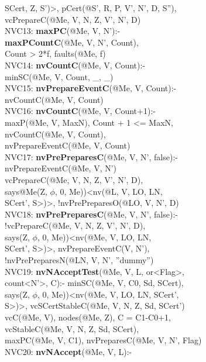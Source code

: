 \begin{code}
\> SCert, Z, S')>, pCert(@S', R, P, V', N', D, S''),\\
\> vcPrepareC(@Me, V, N, Z, V', N', D)\\
NVC13: \textbf{maxPC}(@Me, V, N'):- \\
\> \textbf{maxPCountC}(@Me, V, N', Count),\\
\> Count > 2*f, faults(@Me, f)\\
NVC14: \textbf{nvCountC}(@Me, V, Count):-\\
\> minSC(@Me, V, Count, \_, \_)\\
NVC15: \textbf{nvPrepareEventC}(@Me, V, Count):-\\
\> nvCountC(@Me, V, Count)\\
NVC16: \textbf{nvCountC}(@Me, V, Count+1):-\\
\> maxP(@Me, V, MaxN), Count + 1 <= MaxN, \\
\> nvCountC(@Me, V, Count), \\
\> nvPrepareEventC(@Me, V, Count) \\
NVC17: \textbf{nvPrePreparesC}(@Me, V, N', false):-\\
\> nvPrepareEventC(@Me, V, N')\\
\> vcPrepareC(@Me, V, N, Z, V', N', D),\\
\> says@Me(Z, $\phi$, 0, Me))<nv(@L, V, LO, LN, \\
\> SCert', S>)>, !nvPrePreparesO(@LO, V, N', D)\\
NVC18: \textbf{nvPrePreparesC}(@Me, V, N', false):-\\
\> !vcPrepareC(@Me, V, N, Z, V', N', D),\\
\> says(Z, $\phi$, 0, Me))<nv(@Me, V, LO, LN, \\
\> SCert', S>)>, nvPrepareEventC(V, N'), \\
\> !nvPrePreparesN(@LN, V, N', ''dummy'')\\
NVC19: \textbf{nvNAcceptTest}(@Me, V, L, or<Flag>, \\
\> count<N'>, C):- minSC(@Me, V, C0, Sd, SCert), \\
\> says(Z, $\phi$, 0, Me))<nv(@Me, V, LO, LN, SCert', \\
\> S>)>, vcSCertStableC(@Me, V, N, Z, Sd, SCert')\\
\> vcC(@Me, V), nodes(@Me, Z), C = C1-C0+1, \\
\> vcStableC(@Me, V, N, Z, Sd, SCert), \\
\> maxPC(@Me, V, C1), nvPreparesC(@Me, V, N', Flag)\\
NVC20: \textbf{nvNAccept}(@Me, V, L):- \\

\end{code}
